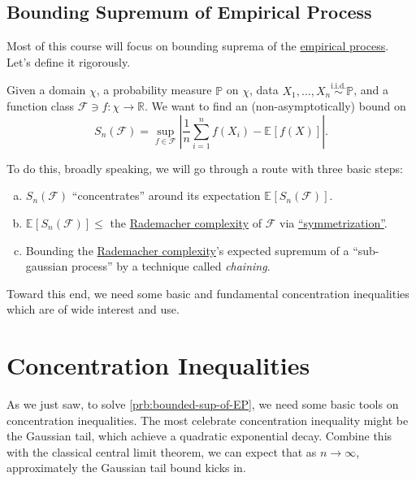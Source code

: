 \section{Bounding Supremum of Empirical Process}
Most of this course will focus on bounding suprema of the \hyperref[def:EP]{empirical process}. Let's define it rigorously.

\begin{problem}\label{prb:bounded-sup-of-EP}
Given a domain \(\chi \), a probability measure \(\mathbb{P} \) on \(\chi \), data \(X_1, \dots , X_n \overset{\text{i.i.d.} }{\sim } \mathbb{P} \), and a function class \(\mathscr{F}\ni f \colon \chi \to \mathbb{R}  \). We want to find an (non-asymptotically) bound on
\[
  S_n(\mathscr{F} ) = \sup _{f\in \mathscr{F} } \left\vert \frac{1}{n} \sum_{i=1}^{n} f(X_i) - \mathbb{E}_{}\left[f(X) \right]  \right\vert.
\]
\end{problem}
\begin{answer}
  To do this, broadly speaking, we will go through a route with three basic steps:
  \begin{enumerate}[(a)]
    \item \(S_n(\mathscr{F} )\) ``concentrates'' around its expectation \(\mathbb{E}_{}\left[S_n(\mathscr{F} ) \right] \).
    \item \(\mathbb{E}_{}\left[S_n(\mathscr{F} ) \right] \leq \) the \hyperref[def:Rademacher-complexity]{Rademacher complexity} of \(\mathscr{F} \) via \hyperref[lma:symmetrization]{``symmetrization''}.
    \item Bounding the \hyperref[def:Rademacher-complexity]{Rademacher complexity}'s expected supremum of a ``sub-gaussian process'' by a technique called \emph{chaining}.
  \end{enumerate}
\end{answer}

Toward this end, we need some basic and fundamental concentration inequalities which are of wide interest and use.

\chapter{Concentration Inequalities}
As we just saw, to solve \autoref{prb:bounded-sup-of-EP}, we need some basic tools on concentration inequalities. The most celebrate concentration inequality might be the Gaussian tail, which achieve a quadratic exponential decay. Combine this with the classical central limit theorem, we can expect that as \(n \to \infty \), approximately the Gaussian tail bound kicks in.

